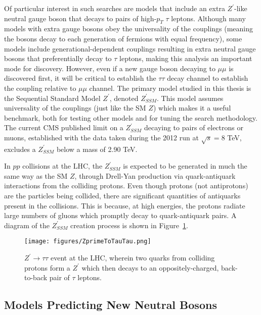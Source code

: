 Of particular interest in such searches are models that include an extra $Z^\prime$-like neutral gauge boson that decays to pairs of high-$p_{T}$ $\tau$ leptons. Although many models with extra gauge bosons obey the universality of the couplings (meaning the bosons decay to each generation of fermions with equal frequency), some models include generational-dependent couplings resulting in extra neutral gauge bosons that preferentially decay to $\tau$ leptons, making this analysis an important mode for discovery. However, even if a new gauge boson decaying to $\mu\mu$ is discovered first, it will be critical to establish the $\tau\tau$ decay channel to establish the coupling relative to $\mu\mu$ channel. The primary model studied in this thesis is the Sequential Standard Model $Z^\prime$, denoted $Z^{\prime}_{SSM}$. This model assumes universality of the couplings (just like the SM $Z$) which makes it a useful benchmark, both for testing other models and for tuning the search methodology. The current CMS published limit on a $Z^{\prime}_{SSM}$ decaying to pairs of electrons or muons, established with the data taken during the 2012 run at $\sqrt{s} = 8$ TeV, excludes a $Z^{\prime}_{SSM}$ below a mass of 2.90 TeV\cite{ZprimeToEE}.

In $pp$ collisions at the LHC, the $Z^\prime_{SSM}$ is expected to be generated in much the same way as the SM $Z$, through Drell-Yan production via quark-antiquark interactions from the colliding protons. Even though protons (not antiprotons) are the particles being collided, there are significant quantities of antiquarks present in the collisions. This is because, at high energies, the protons radiate large numbers of gluons which promptly decay to quark-antiquark pairs. A diagram of the $Z^\prime_{SSM}$ creation process is shown in Figure~\ref{fig:ZprimeToTauTau}.

\begin{figure}
\centering
  \texttt{[image: figures/ZprimeToTauTau.png]}
  \caption{\label{fig:ZprimeToTauTau} $Z^\prime \to \tau\tau$ event at the LHC, wherein two quarks from colliding protons form a $Z^\prime$ which then decays to an oppositely-charged, back-to-back pair of $\tau$ leptons.}
\end{figure}

\subsection{Models Predicting New Neutral Bosons}

